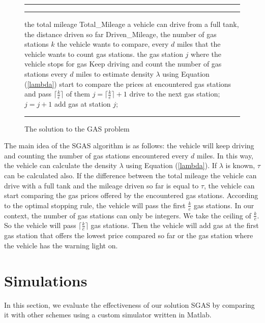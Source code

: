 \documentclass[conference]{IEEEtran}
\theoremstyle{definition}
\begin{document}
\begin{figure}[!hbt]
\vspace{0.2cm}
\hrule \medskip {} \smallskip
\hrule
\smallskip
\begin{algorithmic}[1]
 the total mileage Total\_Mileage a vehicle can drive from a full tank, the distance driven so far Driven\_Mileage, the number of gas stations $k$ the vehicle wants to compare, every $d$ miles that the vehicle wants to count gas stations.
 the gas station $j$ where the vehicle stops for gas
\STATE Keep driving and count the number of gas stations every $d$ miles to estimate density $\lambda$ using Equation (\ref{lambda})
\ENDWHILE
{}
\STATE start to compare the prices at encountered gas stations and pass $\lceil\frac{k}{e}\rceil$ of them
\ENDIF
\STATE $j = \lceil\frac{k}{e}\rceil + 1$
\STATE drive to the next gas station; $j = j+1$
\ENDWHILE
\STATE add gas at station $j$;
\end{algorithmic}
\hrule
\caption{The solution to the GAS problem}
\label{SGAS}
\end{figure}

The main idea of the SGAS algorithm is as follows: the vehicle will keep driving and counting the number of gas stations encountered every $d$ miles. In this way, the vehicle can calculate the density $\lambda$ using Equation (\ref{lambda}). If $\lambda$ is known, $\tau$ can be calculated also. If the difference between the total mileage the vehicle can drive with a full tank and the mileage driven so far is equal to $\tau$, the vehicle can start comparing the gas prices offered by the encountered gas stations. According to the optimal stopping rule, the vehicle will pass the first $\frac{k}{e}$ gas stations. In our context, the number of gas stations can only be integers. We take the ceiling of $\frac{k}{e}$. So the vehicle will pass $\lceil\frac{k}{e}\rceil$ gas stations. Then the vehicle will add gas at the first gas station that offers the lowest price compared so far or the gas station where the vehicle has the warning light on.

\section{Simulations} \label{simulations}
In this section, we evaluate the effectiveness of our solution SGAS by comparing it with other schemes using a custom simulator written in Matlab.
\end{document}
